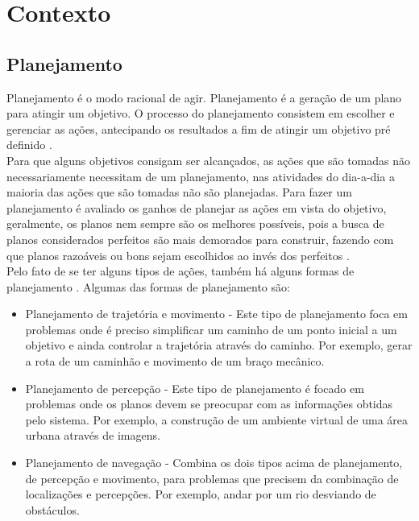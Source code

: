 \chapter{\label{chap:conte}Contexto}


\section{Planejamento} 
Planejamento é o modo racional de agir. Planejamento é a geração de um plano para atingir um objetivo. O processo do planejamento consistem em escolher e gerenciar as ações, antecipando os resultados a fim de atingir um objetivo pré definido \cite{ghallab2004automated}. \\
Para que alguns objetivos consigam ser alcançados, as ações que são tomadas não necessariamente necessitam de um planejamento, nas atividades do dia-a-dia a maioria das ações que são tomadas não são planejadas. Para fazer um planejamento é avaliado os ganhos de planejar as ações em vista do objetivo, geralmente, os planos nem sempre são os melhores possíveis, pois a busca de planos considerados perfeitos são mais demorados para construir, fazendo com que planos razoáveis ou bons sejam escolhidos ao invés dos perfeitos \cite{ghallab2004automated}. \\
Pelo fato de se ter alguns tipos de ações, também há alguns formas de planejamento \cite{ghallab2004automated}. Algumas das formas de planejamento são:

\begin{itemize}
	\item Planejamento de trajetória e movimento - Este tipo de planejamento foca em problemas onde é preciso simplificar um caminho de um ponto inicial a um objetivo e ainda controlar a trajetória através do caminho. Por exemplo, gerar a rota de um caminhão e movimento de um braço mecânico. 
	\item Planejamento de percepção - Este tipo de planejamento é focado em problemas onde os planos devem se preocupar com as informações obtidas pelo sistema. Por exemplo,  a construção de um ambiente virtual de uma área urbana através de imagens. 
	\item Planejamento de navegação - Combina os dois tipos acima de planejamento, de percepção e movimento, para problemas que precisem da combinação de localizações e percepções. Por exemplo, andar por um rio desviando de obstáculos.  
\end{itemize}

